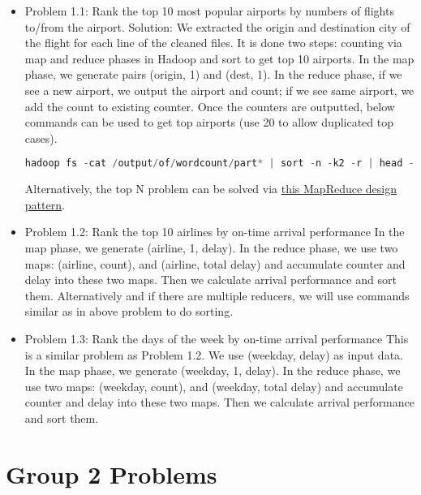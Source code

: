 \documentclass[fontsize=11pt,paper=a4]{scrartcl}
\begin{document}
\begin{itemize} 
\item Problem 1.1: Rank the top 10 most popular airports by numbers of flights to/from the airport.
Solution: We extracted the origin and destination city of the flight for each line of the cleaned files. It is done two steps: counting via map and reduce phases in Hadoop and sort to get top 10 airports. In the map phase, we generate pairs (origin, 1) and (dest, 1). In the reduce phase, if we see a new airport, we output the airport and count; if we see same airport, we add the count to existing counter. Once the counters are outputted, below commands can be used to get top airports (use 20 to allow duplicated top cases). 
\begin{lstlisting}[language = C++]
hadoop fs -cat /output/of/wordcount/part* | sort -n -k2 -r | head -n20
\end{lstlisting}
Alternatively, the top N problem can be solved via \href{https://github.com/adamjshook/mapreducepatterns/blob/master/MRDP/src/main/java/mrdp/ch3/TopTenDriver.java}{this MapReduce design pattern}. 
\item Problem 1.2: Rank the top 10 airlines by on-time arrival performance
In the map phase, we generate (airline, 1, delay). In the reduce phase, we use two maps: (airline, count), and (airline, total delay) and accumulate counter and delay into these two maps. Then we calculate arrival performance and sort them. Alternatively and if there are multiple reducers, we will use commands similar as in above problem to do sorting. 
\item Problem 1.3: Rank the days of the week by on-time arrival performance
This is a similar problem as Problem 1.2. We use (weekday, delay) as input data. In the map phase, we generate (weekday, 1, delay). In the reduce phase, we use two maps: (weekday, count), and (weekday, total delay) and accumulate counter and delay into these two maps. Then we calculate arrival performance and sort them.   
\end{itemize}
 
\section{Group 2 Problems}
 
\end{document}
